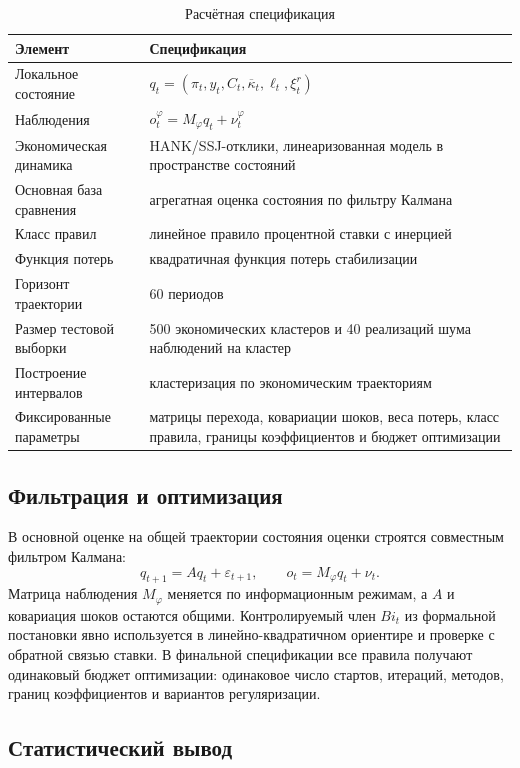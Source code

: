 \begin{table}[H]
\centering
\small
\caption{Расчётная спецификация}
\label{tab:experiment_design}
\begin{tabularx}{\textwidth}{@{}>{\raggedright\arraybackslash}p{}X@{}}
\toprule
Элемент & Спецификация \\
\midrule
Локальное состояние & \(q_t=(\pi_t,y_t,C_t,\overline{\kappa}_t,\ell_t,\xi_t^r)\) \\
Наблюдения & \(o_t^\varphi=M_\varphi q_t+\nu_t^\varphi\) \\
Экономическая динамика & HANK/SSJ-отклики, линеаризованная модель в пространстве состояний \\
Основная база сравнения & агрегатная оценка состояния по фильтру Калмана \\
Класс правил & линейное правило процентной ставки с инерцией \\
Функция потерь & квадратичная функция потерь стабилизации \\
Горизонт траектории & 60 периодов \\
Размер тестовой выборки & 500 экономических кластеров и 40 реализаций шума наблюдений на кластер \\
Построение интервалов & кластеризация по экономическим траекториям \\
Фиксированные параметры & матрицы перехода, ковариации шоков, веса потерь, класс правила, границы коэффициентов и бюджет оптимизации \\
\bottomrule
\end{tabularx}
\end{table}

\subsection{Фильтрация и оптимизация}

В основной оценке на общей траектории состояния оценки строятся совместным фильтром Калмана:
\[
q_{t+1}=Aq_t+\varepsilon_{t+1},
\qquad
o_t=M_\varphi q_t+\nu_t.
\]
Матрица наблюдения \(M_\varphi\) меняется по информационным режимам, а \(A\) и ковариация шоков
остаются общими. Контролируемый член \(B i_t\) из формальной постановки явно используется в
линейно-квадратичном ориентире и проверке с обратной связью ставки. В финальной спецификации все правила получают
одинаковый бюджет оптимизации:
одинаковое число стартов, итераций, методов, границ коэффициентов и вариантов регуляризации.

\subsection{Статистический вывод}

